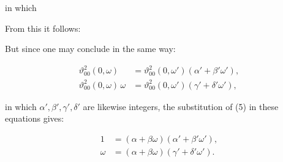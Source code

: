 
in which


From this it follows:


But since one may conclude in the same way:

\[
\begin{aligned}
\vartheta_{00}^2(0,\omega) &= \vartheta_{00}^2(0,\omega')(\alpha'+\beta'\omega'),\\
\vartheta_{00}^2(0,\omega)\,\omega &= \vartheta_{00}^2(0,\omega')(\gamma'+\delta'\omega'),
\end{aligned}
\]

in which $\alpha',\beta',\gamma',\delta'$ are likewise integers, the substitution of (5) in these equations gives:

\[
\begin{aligned}
1 &= (\alpha+\beta\omega)(\alpha'+\beta'\omega'),\\
\omega &= (\alpha+\beta\omega)(\gamma'+\delta'\omega').
\end{aligned}
\]
